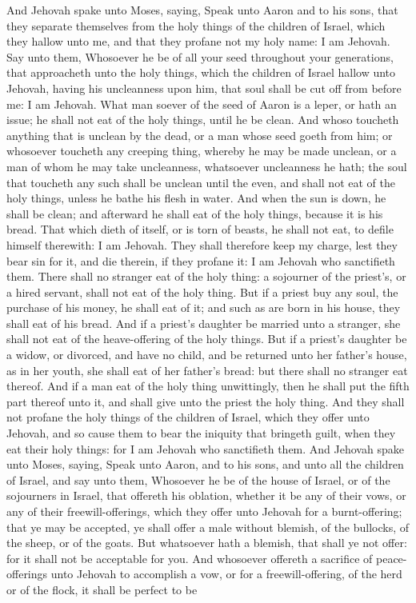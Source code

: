 And Jehovah spake unto Moses, saying, Speak unto Aaron and to his sons, that they separate themselves from the holy things of the children of Israel, which they hallow unto me, and that they profane not my holy name: I am Jehovah. Say unto them, Whosoever he be of all your seed throughout your generations, that approacheth unto the holy things, which the children of Israel hallow unto Jehovah, having his uncleanness upon him, that soul shall be cut off from before me: I am Jehovah. What man soever of the seed of Aaron is a leper, or hath an issue; he shall not eat of the holy things, until he be clean. And whoso toucheth anything that is unclean by the dead, or a man whose seed goeth from him; or whosoever toucheth any creeping thing, whereby he may be made unclean, or a man of whom he may take uncleanness, whatsoever uncleanness he hath; the soul that toucheth any such shall be unclean until the even, and shall not eat of the holy things, unless he bathe his flesh in water. And when the sun is down, he shall be clean; and afterward he shall eat of the holy things, because it is his bread. That which dieth of itself, or is torn of beasts, he shall not eat, to defile himself therewith: I am Jehovah. They shall therefore keep my charge, lest they bear sin for it, and die therein, if they profane it: I am Jehovah who sanctifieth them.  There shall no stranger eat of the holy thing: a sojourner of the priest’s, or a hired servant, shall not eat of the holy thing. But if a priest buy any soul, the purchase of his money, he shall eat of it; and such as are born in his house, they shall eat of his bread. And if a priest’s daughter be married unto a stranger, she shall not eat of the heave-offering of the holy things. But if a priest’s daughter be a widow, or divorced, and have no child, and be returned unto her father’s house, as in her youth, she shall eat of her father’s bread: but there shall no stranger eat thereof. And if a man eat of the holy thing unwittingly, then he shall put the fifth part thereof unto it, and shall give unto the priest the holy thing. And they shall not profane the holy things of the children of Israel, which they offer unto Jehovah, and so cause them to bear the iniquity that bringeth guilt, when they eat their holy things: for I am Jehovah who sanctifieth them.  And Jehovah spake unto Moses, saying, Speak unto Aaron, and to his sons, and unto all the children of Israel, and say unto them, Whosoever he be of the house of Israel, or of the sojourners in Israel, that offereth his oblation, whether it be any of their vows, or any of their freewill-offerings, which they offer unto Jehovah for a burnt-offering; that ye may be accepted, ye shall offer a male without blemish, of the bullocks, of the sheep, or of the goats. But whatsoever hath a blemish, that shall ye not offer: for it shall not be acceptable for you. And whosoever offereth a sacrifice of peace-offerings unto Jehovah to accomplish a vow, or for a freewill-offering, of the herd or of the flock, it shall be perfect to be 